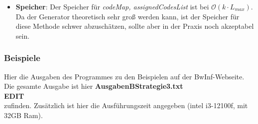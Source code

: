 \documentclass[a4paper,10pt,ngerman]{scrartcl}
\begin{document}
\begin{itemize}
\begin{itemize}
    \item \textbf{Speicher}:
    Der Speicher für \textit{codeMap, assignedCodesList} ist bei $\mathcal{O}(k\cdot L_{max})$. Da der Generator theoretisch sehr groß werden kann, ist der Speicher für diese Methode schwer abzuschätzen, sollte aber in der Praxis noch akzeptabel sein.
  \end{itemize}

\end{itemize}
\subsubsection{Beispiele}
Hier die Ausgaben des Programmes zu den Beispielen auf der BwInf-Webseite. Die gesamte Ausgabe ist hier \textbf{AusgabenBStrategie3.txt} \\ \newline \textbf{EDIT} \\ \newline zufinden. Zusätzlich ist hier die Ausführungszeit angegeben (intel i3-12100f, mit 32GB Ram).
\end{document}
